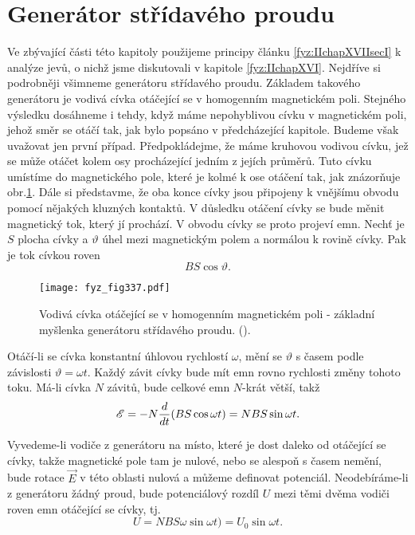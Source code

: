 {\section{Generátor střídavého proudu}\label{fyz:IIchapXVIIsecV}
  Ve zbývající části této kapitoly použijeme principy článku \ref{fyz:IIchapXVIIsecI} k analýze 
  jevů, o nichž jsme diskutovali v kapitole \ref{fyz:IIchapXVI}. Nejdříve si podrobněji všimneme 
  generátoru střídavého proudu. Základem takového generátoru je vodivá cívka otáčející se v 
  homogenním magnetickém poli. Stejného výsledku dosáhneme i tehdy, když máme nepohyblivou cívku v 
  magnetickém poli, jehož směr se otáčí tak, jak bylo popsáno v předcházející kapitole. Budeme však 
  uvažovat jen první případ. Předpokládejme, že máme kruhovou vodivou cívku, jež se může otáčet 
  kolem osy procházející jedním z jejích průměrů. Tuto cívku umístíme do magnetického pole, které 
  je kolmé k ose otáčení tak, jak znázorňuje obr.\ref{fyz:fig337}. Dále si představme, že oba konce 
  cívky jsou připojeny k vnějšímu obvodu pomocí nějakých kluzných kontaktů. V důsledku otáčení 
  cívky se bude měnit magnetický tok, který jí prochází. V obvodu cívky se proto projeví emn. Nechť 
  je \(S\) plocha cívky a \(\vartheta\) úhel mezi magnetickým polem a normálou k rovině cívky. Pak 
  je tok cívkou roven
  \begin{equation}\label{fyz:eq390}
    BS\cos\vartheta.
  \end{equation}
  
  \begin{figure}[ht!]  %
    \centering
    \texttt{[image: fyz\_fig337.pdf]}
    \caption{Vodivá cívka otáčející se v homogenním magnetickém poli - základní myšlenka generátoru 
             střídavého proudu.
             (\cite[s.~301]{Feynman02}).}
    \label{fyz:fig337}
  \end{figure}
  Otáčí-li se cívka konstantní úhlovou rychlostí \(\omega\), mění se \(\vartheta\) s časem podle 
  závislosti \(\vartheta = \omega t\). Každý závit cívky bude mít emn rovno rychlosti změny tohoto 
  toku. Má-li cívka \(N\) závitů, bude celkové emn \(N\)-krát větší, takž
  \begin{equation}\label{fyz:eq391}
    \mathscr{E} = - N\dfrac{d  }{d t}(BS\cos\omega t)= NBS\sin\omega t.
  \end{equation}
  
  Vyvedeme-li vodiče z generátoru na místo, které je dost daleko od otáčející se cívky, takže 
  magnetické pole tam je nulové, nebo se alespoň s časem nemění, bude rotace \(\vec{E}\) v této 
  oblasti nulová a můžeme definovat potenciál. Neodebíráme-li z generátoru žádný proud, bude 
  potenciálový rozdíl \(U\) mezi těmi dvěma vodiči roven emn otáčející se cívky, tj.
  \begin{equation}\label{fyz:eq392}
    U = NBS\omega\sin\omega t)= U_0\sin\omega t.
  \end{equation}
  
}
